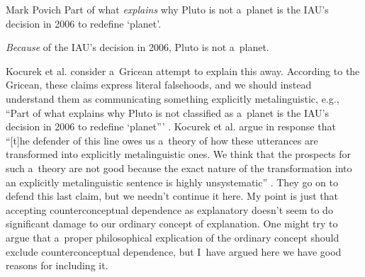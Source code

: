 \begin{artengenv}{Mark Povich}
Part of what \textit{explains} why Pluto is not a~planet is the IAU's decision in 2006 to redefine ‘planet'.

\textit{Because} of the IAU's decision in 2006, Pluto is not a~planet.
\parencite[][p.7, my emphasis]{kocurek_against_2020}%


Kocurek et al. consider a~Gricean attempt to explain this away. According to the Gricean, these claims express literal falsehoods, and we should instead understand them as communicating something explicitly metalinguistic, e.g., ``Part of what explains why Pluto is not classified as a~planet is the IAU's decision in 2006 to redefine ‘planet'''
\parencite*[][p.7]{kocurek_against_2020}. %
 Kocurek et al. argue in response that ``[t]he defender of this line owes us a~theory of how these utterances are transformed into explicitly metalinguistic ones. We think that the prospects for such a~theory are not good because the exact nature of the transformation into an explicitly metalinguistic sentence is highly unsystematic'' 
\parencite*[][p.7]{kocurek_against_2020}. %
 They go on to defend this last claim, but we needn't continue it here. My point is just that accepting counterconceptual dependence as explanatory doesn't seem to do significant damage to our ordinary concept of explanation. One might try to argue that a~proper philosophical explication of the ordinary concept should exclude counterconceptual dependence, but I~have argued here we have good reasons for including it.


\end{artengenv}
